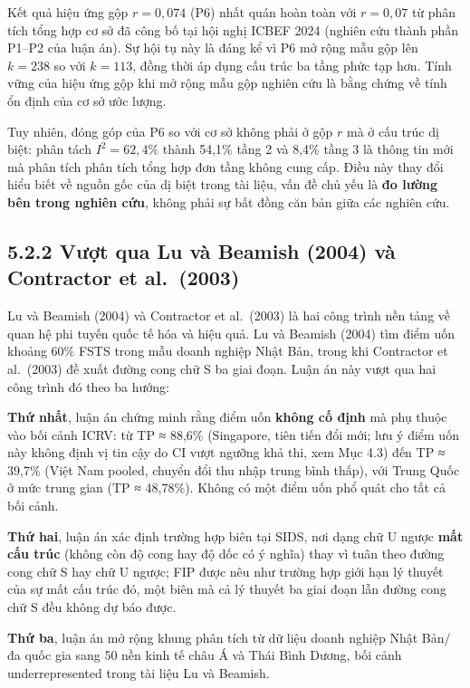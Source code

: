 \documentclass[
  a4paper,
  13pt]{extreport}
\begin{document}
Kết quả hiệu ứng gộp \(r = 0{,}074\) (P6) nhất quán hoàn toàn với
\(r = 0{,}07\) từ phân tích tổng hợp cơ sở đã công bố tại hội nghị ICBEF
2024 (nghiên cứu thành phần P1--P2 của luận án). Sự hội tụ này là đáng
kể vì P6 mở rộng mẫu gộp lên \(k = 238\) so với \(k = 113\), đồng thời
áp dụng cấu trúc ba tầng phức tạp hơn. Tính vững của hiệu ứng gộp khi mở
rộng mẫu gộp nghiên cứu là bằng chứng về tính ổn định của cơ sở ước
lượng.

Tuy nhiên, đóng góp của P6 so với cơ sở không phải ở gộp \(r\) mà ở cấu
trúc dị biệt: phân tách \(I^2 = 62{,}4\%\) thành 54,1\% tầng 2 và 8,4\%
tầng 3 là thông tin mới mà phân tích phân tích tổng hợp đơn tầng không
cung cấp. Điều này thay đổi hiểu biết về nguồn gốc của dị biệt trong tài
liệu, vấn đề chủ yếu là \textbf{đo lường bên trong nghiên cứu}, không
phải sự bất đồng căn bản giữa các nghiên cứu.

\hypertarget{vux1b0ux1ee3t-qua-lu-vuxe0-beamish-2004-vuxe0-contractor-et-al.-2003}{%
\subsection{5.2.2 Vượt qua Lu và Beamish (2004) và Contractor et
al.~(2003)}\label{vux1b0ux1ee3t-qua-lu-vuxe0-beamish-2004-vuxe0-contractor-et-al.-2003}}

Lu và Beamish (2004) và Contractor et al.~(2003) là hai công trình nền
tảng về quan hệ phi tuyến quốc tế hóa và hiệu quả. Lu và Beamish (2004)
tìm điểm uốn khoảng 60\% FSTS trong mẫu doanh nghiệp Nhật Bản, trong khi
Contractor et al.~(2003) đề xuất đường cong chữ S ba giai đoạn. Luận án
này vượt qua hai công trình đó theo ba hướng:

\textbf{Thứ nhất}, luận án chứng minh rằng điểm uốn \textbf{không cố
định} mà phụ thuộc vào bối cảnh ICRV: từ TP ≈ 88,6\% (Singapore, tiên
tiến đổi mới; lưu ý điểm uốn này không định vị tin cậy do CI vượt ngưỡng
khả thi, xem Mục 4.3) đến TP ≈ 39,7\% (Việt Nam pooled, chuyển đổi thu
nhập trung bình thấp), với Trung Quốc ở mức trung gian (TP ≈ 48,78\%).
Không có một điểm uốn phổ quát cho tất cả bối cảnh.

\textbf{Thứ hai}, luận án xác định trường hợp biên tại SIDS, nơi dạng
chữ U ngược \textbf{mất cấu trúc} (không còn độ cong hay độ dốc có ý
nghĩa) thay vì tuân theo đường cong chữ S hay chữ U ngược; FIP được nêu
như trường hợp giới hạn lý thuyết của sự mất cấu trúc đó, một biên mà cả
lý thuyết ba giai đoạn lẫn đường cong chữ S đều không dự báo được.

\textbf{Thứ ba}, luận án mở rộng khung phân tích từ dữ liệu doanh nghiệp
Nhật Bản/đa quốc gia sang 50 nền kinh tế châu Á và Thái Bình Dương, bối
cảnh underrepresented trong tài liệu Lu và Beamish.
\end{document}
